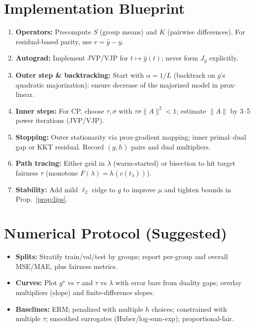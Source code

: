 \documentclass[11pt]{article}
\theoremstyle{plain}
\theoremstyle{definition}
\newcommand{\1}{\mathbf{1}}
\begin{document}
\section{Implementation Blueprint}
\begin{enumerate}[leftmargin=2em]
 \item \textbf{Operators:} Precompute $S$ (group means) and $K$ (pairwise differences). For residual-based parity, use $r=\hat y-y$.
 \item \textbf{Autograd:} Implement JVP/VJP for $t\mapsto \hat y(t)$; never form $J_{\hat y}$ explicitly.
 \item \textbf{Outer step \& backtracking:} Start with $\alpha=1/L$ (backtrack on $g$’s quadratic majorization); ensure decrease of the majorized model in prox-linear.
 \item \textbf{Inner steps:} For CP, choose $\tau,\sigma$ with $\tau\sigma\|A\|^2<1$; estimate $\|A\|$ by 3--5 power iterations (JVP/VJP).
 \item \textbf{Stopping:} Outer stationarity via prox-gradient mapping; inner primal--dual gap or KKT residual. Record $(g,h)$ pairs and dual multipliers.
 \item \textbf{Path tracing:} Either grid in $\lambda$ (warm-started) or bisection to hit target fairness $\tau$ (monotone $F(\lambda)=h(c(t_\lambda))$).
 \item \textbf{Stability:} Add mild $\ell_2$ ridge to $g$ to improve $\mu$ and tighten bounds in Prop.~\ref{prop:lips}.
\end{enumerate}

\section{Numerical Protocol (Suggested)}
\begin{itemize}[leftmargin=2em]
 \item \textbf{Splits:} Stratify train/val/test by groups; report per-group and overall MSE/MAE, plus fairness metrics.
 \item \textbf{Curves:} Plot $g^\star$ vs $\tau$ and $\tau$ vs $\lambda$ with error bars from duality gaps; overlay multipliers (slope) and finite-difference slopes.
 \item \textbf{Baselines:} ERM; penalized with multiple $h$ choices; constrained with multiple $\tau$; smoothed surrogates (Huber/log-sum-exp); proportional-fair.
\end{itemize}
\end{document}
